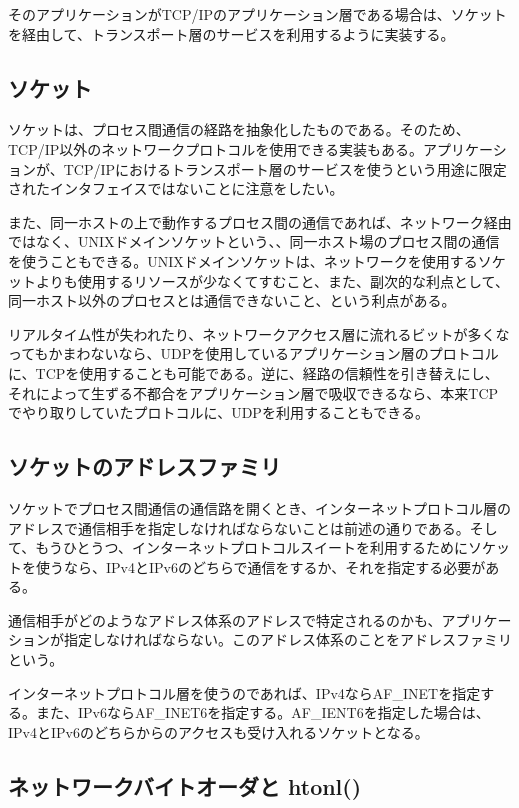 そのアプリケーションがTCP/IPのアプリケーション層である場合は、ソケットを経由して、トランスポート層のサービスを利用するように実装する。

\subsection{ソケット}

ソケットは、プロセス間通信の経路を抽象化したものである。そのため、TCP/IP以外のネットワークプロトコルを使用できる実装もある。アプリケーションが、TCP/IPにおけるトランスポート層のサービスを使うという用途に限定されたインタフェイスではないことに注意をしたい。

また、同一ホストの上で動作するプロセス間の通信であれば、ネットワーク経由ではなく、UNIXドメインソケットという、、同一ホスト場のプロセス間の通信を使うこともできる。UNIXドメインソケットは、ネットワークを使用するソケットよりも使用するリソースが少なくてすむこと、また、副次的な利点として、同一ホスト以外のプロセスとは通信できないこと、という利点がある。

リアルタイム性が失われたり、ネットワークアクセス層に流れるビットが多くなってもかまわないなら、UDPを使用しているアプリケーション層のプロトコルに、TCPを使用することも可能である。逆に、経路の信頼性を引き替えにし、それによって生ずる不都合をアプリケーション層で吸収できるなら、本来TCPでやり取りしていたプロトコルに、UDPを利用することもできる。



\subsection{ソケットのアドレスファミリ}
ソケットでプロセス間通信の通信路を開くとき、インターネットプロトコル層のアドレスで通信相手を指定しなければならないことは前述の通りである。そして、もうひとうつ、インターネットプロトコルスイートを利用するためにソケットを使うなら、IPv4とIPv6のどちらで通信をするか、それを指定する必要がある。

通信相手がどのようなアドレス体系のアドレスで特定されるのかも、アプリケーションが指定しなければならない。このアドレス体系のことをアドレスファミリという。

インターネットプロトコル層を使うのであれば、IPv4ならAF\_INETを指定する。また、IPv6ならAF\_INET6を指定する。AF\_IENT6を指定した場合は、IPv4とIPv6のどちらからのアクセスも受け入れるソケットとなる。

\subsection{ネットワークバイトオーダと htonl()}

